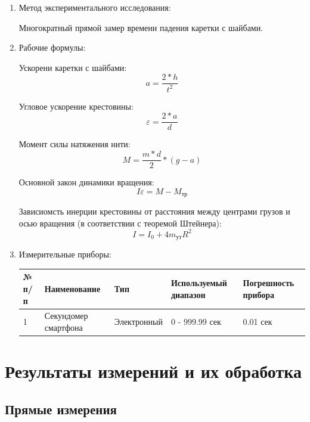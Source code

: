 \documentclass[12pt, a4paper]{article}
\begin{document}
\begin{enumerate}
\item Метод экспериментального исследования:

Многократный прямой замер времени падения каретки с шайбами.

\item Рабочие формулы:

Ускорени каретки с шайбами:
\begin{equation}
a = \frac{2*h}{t^2}
\end{equation}

Угловое ускорение крестовины:
\begin{equation}
\varepsilon = \frac{2*a}{d}
\end{equation}

Момент силы натяжения нити:
\begin{equation}
M = \frac{m*d}{2} * (g-a)
\end{equation}

Основной закон динамики вращения:
\begin{equation}
I\varepsilon = M - M_{\text{тр}}
\end{equation}

Зависиомсть инерции крестовины от расстояния между центрами грузов и осью вращения (в соответствии с теоремой Штейнера):
\begin{equation} \label{eq:1}
I = I_0 + 4m_{\text{ут}}R^2 
\end{equation}

\item Измерительные приборы:

\begin{center}

\begin{table}[h!]
\begin{tabular}{|l|l|l|l|l|}
\hline
№ п/п & Наименование & Тип & Используемый диапазон & Погрешность прибора\\
\hline
1 & Секундомер смартфона & Электронный & 0 - 999.99 сек  & 0.01 сек\\
\hline
\end{tabular}
\end{table}
\end{center}
\end{enumerate}
\section{Результаты измерений и их обработка}
\subsection{Прямые измерения}
\end{document}
